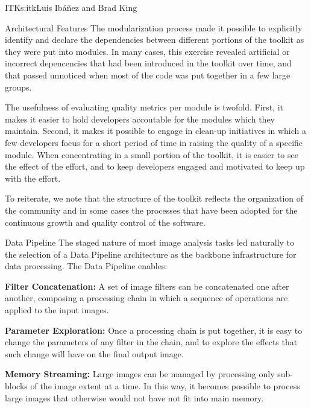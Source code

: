\begin{aosachapter}{ITK}{s:itk}{Luis Ib\'{a}\~{n}ez and Brad King}
\begin{aosasect1}{Architectural Features}
The modularization process made it possible to explicitly identify and
declare the dependencies between different portions of the toolkit as they were
put into modules. In many cases, this exercise revealed artificial or incorrect
depencencies that had been introduced in the toolkit over time, and that passed
unnoticed when most of the code was put together in a few large groups.

The usefulness of evaluating quality metrics per module is twofold. First, it makes it easier to hold developers accoutable for the modules which they
maintain. Second, it makes it possible to engage in
clean-up initiatives in which a few developers focus for a short period of
time in raising the quality of a specific module. When concentrating in a small
portion of the toolkit, it is easier to see the effect of the effort, and to
keep developers engaged and motivated to keep up with the effort.

To reiterate, we note that the structure of the
toolkit reflects the organization of the community and in some cases the
processes that have been adopted for the continuous growth and quality control
of the software.

\begin{aosasect2}{Data Pipeline}\label{sec.itk.datapipeline}
The staged nature of most image analysis tasks led naturally to the selection
of a Data Pipeline architecture as the backbone infrastructure for data
processing. The Data Pipeline enables:

\begin{aosaitemize}

\item \textbf{Filter Concatenation:} A set of image filters can be concatenated
one after another, composing a processing chain in which a sequence of
operations are applied to the input images.

\item \textbf{Parameter Exploration:} Once a processing chain is put together,
it is easy to change the parameters of any filter in the chain, and to explore
the effects that such change will have on the final output image.

\item \textbf{Memory Streaming:} Large images can be managed by processing only
sub-blocks of the image extent at a time. In this way, it becomes possible to
process large images that otherwise would not have not fit into main memory.

\end{aosaitemize}


\end{aosasect2}
\end{aosasect1}
\end{aosachapter}

